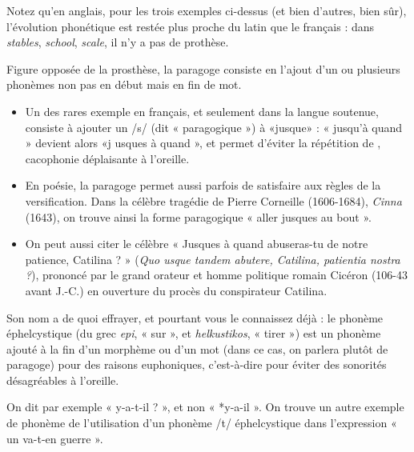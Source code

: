 Notez qu’en anglais, pour les trois exemples ci-dessus (et bien d’autres, bien sûr), l’évolution phonétique est restée plus proche du latin que le français : dans \textit{stables}, \textit{school}, \textit{scale}, il n’y a pas de prothèse.

Figure opposée de la prosthèse, la paragoge consiste en l’ajout d’un ou plusieurs phonèmes non pas en début mais en fin de mot.
\begin{itemize}
\item Un des rares exemple en français, et seulement dans la langue soutenue, consiste à ajouter un /s/ (dit « paragogique ») à «jusque» : « jusqu’à quand » devient alors «j usques à quand », et permet d’éviter la répétition de , cacophonie déplaisante à l’oreille.
\item En poésie, la paragoge permet aussi parfois de satisfaire aux règles de la versification. Dans la célèbre tragédie de Pierre Corneille (1606-1684), \textit{Cinna} (1643), on trouve ainsi la forme paragogique « aller jusques au bout ».
\end{itemize}

\begin{itemize}
\item On peut aussi citer le célèbre « Jusques à quand abuseras-tu de notre patience, Catilina ? » (\textit{Quo usque tandem abutere, Catilina, patientia nostra ?}), prononcé par le grand orateur et homme politique romain Cicéron (106-43 avant J.-C.) en ouverture du procès du conspirateur Catilina.
\end{itemize}

Son nom a de quoi effrayer, et pourtant vous le connaissez déjà : le phonème éphelcystique (du grec \textit{epi}, « sur », et \textit{helkustikos}, « tirer ») est un phonème ajouté à la fin d’un morphème ou d’un mot (dans ce cas, on parlera plutôt de paragoge) pour des raisons euphoniques, c’est-à-dire pour éviter des sonorités désagréables à l’oreille.

On dit par exemple « y-a-t-il ? », et non « *y-a-il ». On trouve un autre exemple de phonème de l’utilisation d’un phonème /t/ éphelcystique dans l’expression « un va-t-en guerre ».

